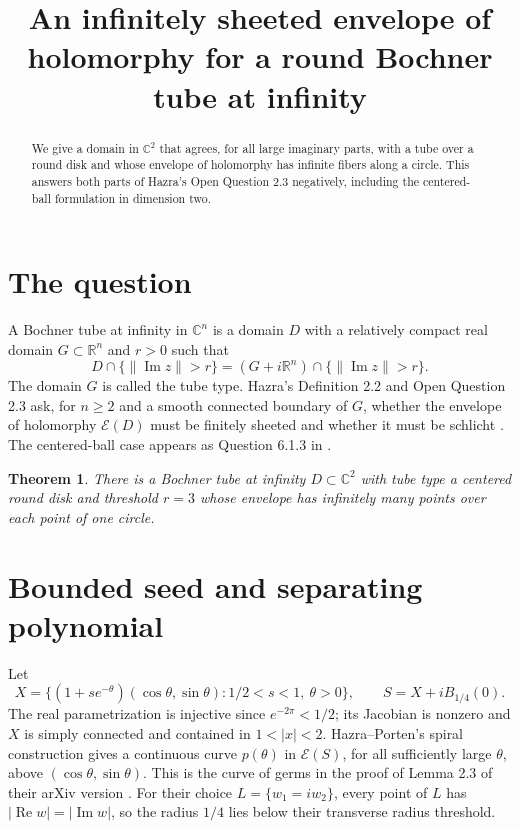 \documentclass[11pt]{amsart}
\title[Infinite sheets for a tube at infinity]{An infinitely sheeted envelope of holomorphy for a round Bochner tube at infinity}
\date{}
\newtheorem{theorem}{Theorem}
\begin{document}
\begin{abstract}
We give a domain in \(\mathbb C^2\) that agrees, for all large imaginary parts, with a tube over a round disk and whose envelope of holomorphy has infinite fibers along a circle. This answers both parts of Hazra's Open Question 2.3 negatively, including the centered-ball formulation in dimension two.
\end{abstract}
\maketitle

\section{The question}
A Bochner tube at infinity in \(\mathbb C^n\) is a domain \(D\) with a relatively compact real domain \(G\subset\mathbb R^n\) and \(r>0\) such that
\[
 D\cap\{\|\operatorname{Im}z\|>r\}
 =
 (G+i\mathbb R^n)\cap\{\|\operatorname{Im}z\|>r\}.
\]
The domain \(G\) is called the tube type. Hazra's Definition 2.2 and Open Question 2.3 ask, for \(n\ge 2\) and a smooth connected boundary of \(G\), whether the envelope of holomorphy \(\mathcal E(D)\) must be finitely sheeted and whether it must be schlicht \cite{hazra}. The centered-ball case appears as Question 6.1.3 in \cite{thesis}.

\begin{theorem}
There is a Bochner tube at infinity \(D\subset\mathbb C^2\) with tube type a centered round disk and threshold \(r=3\) whose envelope has infinitely many points over each point of one circle.
\end{theorem}

\section{Bounded seed and separating polynomial}
Let
\[
 X=\{(1+s e^{-\theta})(\cos\theta,\sin\theta):
                  1/2<s<1,\ \theta>0\},\qquad
 S=X+iB_{1/4}(0).
\]
The real parametrization is injective since \(e^{-2\pi}<1/2\); its Jacobian is nonzero and \(X\) is simply connected and contained in \(1<|x|<2\). Hazra--Porten's spiral construction gives a continuous curve \(p(\theta)\) in \(\mathcal E(S)\), for all sufficiently large \(\theta\), above \((\cos\theta,\sin\theta)\). This is the curve of germs in the proof of Lemma 2.3 of their arXiv version \cite{seed}. For their choice \(L=\{w_1=iw_2\}\), every point of \(L\) has \(|\operatorname{Re} w|=|\operatorname{Im} w|\), so the radius \(1/4\) lies below their transverse radius threshold.
\end{document}
